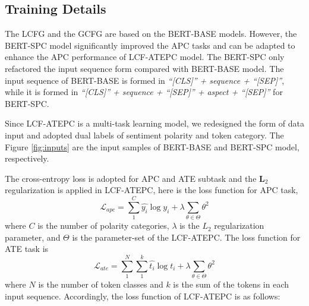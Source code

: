\documentclass[a4paper,fleqn]{cas-sc}
\begin{document}
\subsection{Training Details}

The LCFG and the GCFG are based on the BERT-BASE models. However, the BERT-SPC \cite{song2019attentional} model significantly improved the APC tasks and can be adapted to enhance the APC performance of LCF-ATEPC model. The BERT-SPC only refactored the input sequence form compared with BERT-BASE model. The input sequence of BERT-BASE is formed in \textit{``[CLS]'' + sequence + ``[SEP]''}, while it is formed in \textit{``[CLS]'' + sequence + ``[SEP]'' + aspect + ``[SEP]''} for BERT-SPC.

Since LCF-ATEPC is a multi-task learning model, we redesigned the form of data input and adopted dual labels of sentiment polarity and token category. The Figure \ref{fig:inputs} are the input samples of BERT-BASE and BERT-SPC model, respectively. 

\begin{figure*}[pos=th]
	\centering
	
	\caption{ \ref{fig:input} is he input sequence formatted for the BERT-BASE model. The first line is composed of the aspect term labels; The second and third lines are the input sequence after tokenization and polarity label, respectively. \ref{fig:input1} represent the sample input sequence formatted for BERT-SPC model and the aspects in two position are labeled simultaneously. \ref{fig:input2} depicts a sample of Chinese sequence input format for BERT-SPC model.}
	\label{fig:inputs}
\end{figure*}


The cross-entropy loss is adopted for APC and ATE subtask and the $\mathbf{L}_{2}$ regularization is applied in LCF-ATEPC, here is the loss function for APC task,
\begin{equation}
\mathcal{L}_{apc}=\sum_{1}^{C} \widehat{y_{i}} \log y_{i}+\lambda \sum_{\theta \in \Theta} \theta^{2}
\end{equation}
where $C$ is the number of polarity categories, $\lambda$ is the $L_{2}$ regularization parameter, and $\Theta$ is the parameter-set of the LCF-ATEPC. The loss function for ATE task is 
\begin{equation}
\mathcal{L}_{ate}=\sum_{1}^{N}\sum_{1}^{k}\widehat{t_{i}} \log t_{i}+\lambda \sum_{\theta \in \Theta} \theta^{2}
\end{equation}
where $N$ is the number of token classes and $k$ is the sum of the tokens in each input sequence. Accordingly, the loss function of LCF-ATEPC is as follows:
\end{document}
